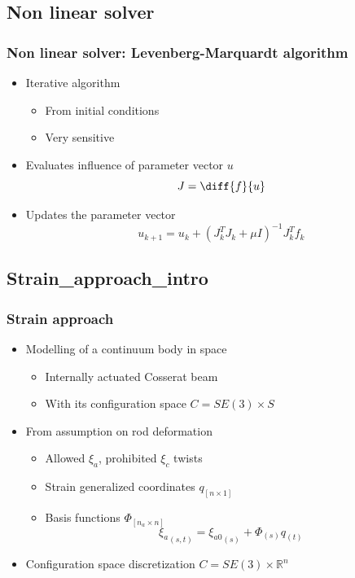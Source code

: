 \documentclass[compress]{thesisbeamer}
\begin{document}
		\subsection{Non linear solver}
        \begin{frame}
        	\frametitle{Non linear solver: Levenberg-Marquardt algorithm}
			\begin{itemize}%
  				\item Iterative algorithm
  				\begin{itemize}
  					\item From initial conditions
  					\item Very sensitive
  				\end{itemize}
  				\item Evaluates influence of parameter vector $ u $
  				\begin{equation}
  				J = \diff{f}{u}
  				\end{equation}
  				\item Updates the parameter vector
  				\begin{equation}
  				{u}_{k+1} = {u}_{k} + {\left({J}_{k}^{T} {J}_{k} + \mu I \right)}^{-1} {J}_{k}^{T} {f}_{k}
  				\end{equation}
 			\end{itemize}
		\end{frame}
		
		\subsection{Strain_approach_intro}
        \begin{frame}
        	\frametitle{Strain approach}
			\begin{itemize}%
  				\item Modelling of a continuum body in space
  				\begin{itemize}
  					\item Internally actuated Cosserat beam
  					\item With its configuration space $ \textit{C} = SE(3) \times \textit{S} $
  				\end{itemize}
  				\item From assumption on rod deformation
  				\begin{itemize}
  					\item Allowed $ \xi_a $, prohibited $ \xi_c $ twists
  					\item Strain generalized coordinates $ q_{[n\times1]}$
  					\item Basis functions ${\Phi}_{\left[n_a \times n \right]} $
  					\begin{equation}
  						{\xi_a}_{\left(s , t \right)} = {\xi_{a0}}_{\left(s \right)} + {\Phi}_{\left(s \right)} {q}_{\left(t \right)}
  					\end{equation}
  				\end{itemize}
  				\item Configuration space discretization $ \textit{C} = SE(3) \times \mathbb{R}^n $
 			\end{itemize}
		\end{frame}
		
\end{document}
